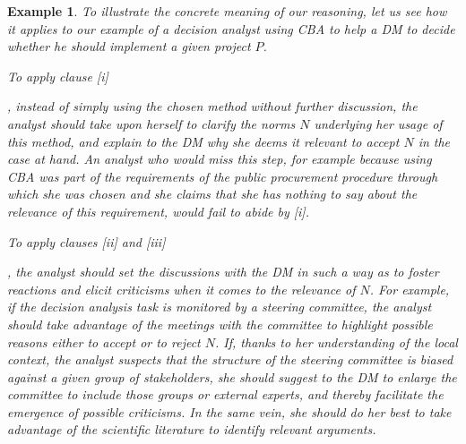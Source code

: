 \documentclass[preprint, french, english, 11pt, authoryear]{elsarticle}%
\newtheorem{example}{Example}
\begin{document}
\begin{example}
To illustrate the concrete meaning of our reasoning, let us see how it applies to our example of a decision analyst using \ac{CBA} to help a \ac{DM} to decide whether he should implement a given project $P$.

\begin{changebar}To apply clause [i]\end{changebar}, instead of simply using the chosen method without further discussion, the analyst should take upon herself to clarify the norms $N$ underlying her usage of this method, and explain to the \ac{DM} why she deems it relevant to accept $N$ in the case at hand.
An analyst who would miss this step, for example because using \ac{CBA} was part of the requirements of the public procurement procedure through which she was chosen and she claims that she has nothing to say about the relevance of this requirement, would fail to abide by [i].
\begin{changebar}To apply clauses [ii] and [iii]\end{changebar}, the analyst should set the discussions with the \ac{DM} in such a way as to foster reactions and elicit criticisms when it comes to the relevance of $N$.
For example, if the decision analysis task is monitored by a steering committee, the analyst should take advantage of the meetings with the committee to highlight possible reasons either to accept or to reject $N$.
If, thanks to her understanding of the local context, the analyst suspects that the structure of the steering committee is biased against a given group of stakeholders, she should suggest to the \ac{DM} to enlarge the committee to include those groups or external experts, and thereby facilitate the emergence of possible criticisms.
In the same vein, she should do her best to take advantage of the scientific literature to identify relevant arguments.  




\end{example}
\end{document}
